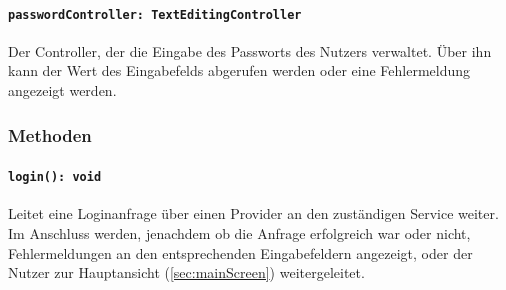 \documentclass{entwurfsheft}
\begin{document}
\begin{sloppypar}
\paragraph{\texttt{passwordController: TextEditingController}}
Der Controller, der die Eingabe des Passworts des Nutzers verwaltet. Über ihn kann der Wert des Eingabefelds abgerufen werden oder eine Fehlermeldung angezeigt werden.
\subsubsection*{Methoden}
\paragraph{\texttt{login(): void}}
Leitet eine Loginanfrage über einen Provider an den zuständigen Service weiter. Im Anschluss werden, jenachdem ob die Anfrage erfolgreich war oder nicht, Fehlermeldungen an den entsprechenden Eingabefeldern angezeigt, oder der Nutzer zur Hauptansicht (\ref{sec:mainScreen}) weitergeleitet.

\newpage

\end{sloppypar}
\end{document}

